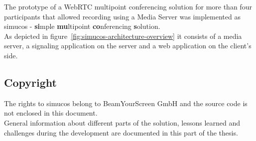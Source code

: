 \documentclass[../../../thesis.tex]{subfiles}
\begin{document}
The prototype of a WebRTC multipoint conferencing solution for more than four participants that allowed recording using a Media Server was implemented as simucos - \textbf{si}mple \textbf{mu}ltipoint \textbf{co}nferencing \textbf{s}olution.\\
As depicted in figure~\ref{fig:simucos-architecture-overview} it consists of a media server, a signaling application on the server and a web application on the client's side.


\subsection{Copyright}
The rights to simucos belong to BeamYourScreen GmbH and the source code is not enclosed in this document.\\
General information about different parts of the solution, lessons learned and challenges during the development are documented in this part of the thesis.
\end{document}
